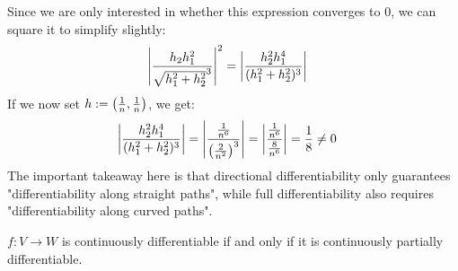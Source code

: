 Since we are only interested in whether this expression converges to $0$, we can square it to simplify slightly:
\begin{align*}
	\abs{\frac{h_2h_1^2}{\sqrt{h_1^2 + h_2^2}^3}}^2
	&=
	\abs{\frac{h_2^2h_1^4}{(h_1^2 + h_2^2)^3}}
\end{align*}
If we now set $h := \qty(\frac{1}{n}, \frac{1}{n})$, we get:
\begin{align*}
	\abs{\frac{h_2^2h_1^4}{(h_1^2 + h_2^2)^3}}
	&=
	\abs{\frac{\frac{1}{n^6}}{\qty(\frac{2}{n^2})^3}}
	=
	\abs{\frac{\frac{1}{n^6}}{\frac{8}{n^6}}}
	=
	\frac{1}{8}
	\neq 
	0
\end{align*}
The important takeaway here is that directional differentiability only guarantees "differentiability along straight paths", while full differentiability also requires "differentiability along curved paths".
\begin{importanttheorem}{}{}
	$f : V \to W$ is continuously differentiable if and only if it is continuously partially differentiable.
\end{importanttheorem}
